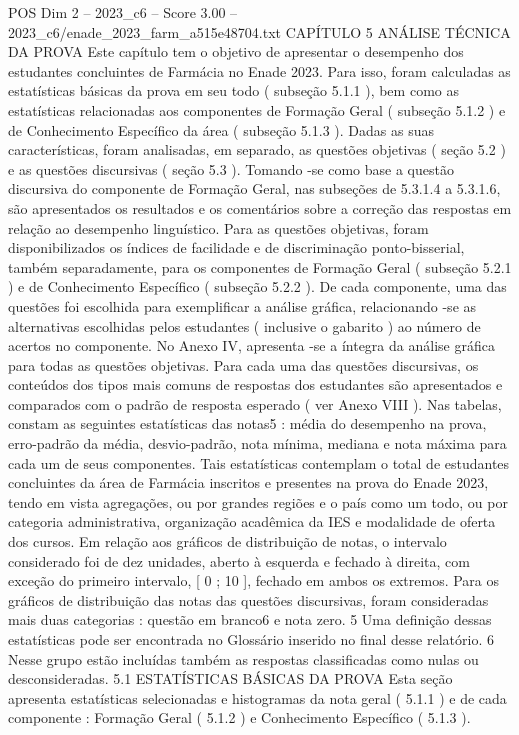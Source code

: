\begin{textsample}{POS Dim 2 – 2023\_c6 – Score 3.00 – 2023\_c6/enade\_2023\_farm\_a515e48704.txt}  \label{ex:f2_pos_164}
CAPÍTULO 5 ANÁLISE TÉCNICA DA PROVA Este capítulo tem o objetivo de apresentar o desempenho dos estudantes concluintes de Farmácia no Enade 2023.
Para isso, foram calculadas as estatísticas básicas da prova em seu todo ( subseção 5.1.1 ), bem como as estatísticas relacionadas aos componentes de Formação Geral ( subseção 5.1.2 ) e de Conhecimento Específico da área ( subseção 5.1.3 ).
Dadas as suas características, foram analisadas, em separado, as questões objetivas ( seção 5.2 ) e as questões discursivas ( seção 5.3 ).
Tomando -se como base a questão discursiva do componente de Formação Geral, nas subseções de 5.3.1.4 a 5.3.1.6, são apresentados os resultados e os comentários sobre a correção das respostas em relação ao desempenho linguístico.
Para as questões objetivas, foram disponibilizados os índices de facilidade e de discriminação ponto-bisserial, também separadamente, para os componentes de Formação Geral ( subseção 5.2.1 ) e de Conhecimento Específico ( subseção 5.2.2 ).
De cada componente, uma das questões foi escolhida para exemplificar a análise gráfica, relacionando -se as alternativas escolhidas pelos estudantes ( inclusive o gabarito ) ao número de acertos no componente.
No Anexo IV, apresenta -se a íntegra da análise gráfica para todas as questões objetivas.
Para cada uma das questões discursivas, os conteúdos dos tipos mais comuns de respostas dos estudantes são apresentados e comparados com o padrão de resposta esperado ( ver Anexo VIII ).
Nas tabelas, constam as seguintes estatísticas das notas5 : média do desempenho na prova, erro-padrão da média, desvio-padrão, nota mínima, mediana e nota máxima para cada um de seus componentes.
Tais estatísticas contemplam o total de estudantes concluintes da área de Farmácia inscritos e presentes na prova do Enade 2023, tendo em vista agregações, ou por grandes regiões e o país como um todo, ou por categoria administrativa, organização acadêmica da IES e modalidade de oferta dos cursos.
Em relação aos gráficos de distribuição de notas, o intervalo considerado foi de dez unidades, aberto à esquerda e fechado à direita, com exceção do primeiro intervalo, [ 0 ; 10 ], fechado em ambos os extremos.
Para os gráficos de distribuição das notas das questões discursivas, foram consideradas mais duas categorias : questão em branco6 e nota zero. 5 Uma definição dessas estatísticas pode ser encontrada no Glossário inserido no final desse relatório. 6 Nesse grupo estão incluídas também as respostas classificadas como nulas ou desconsideradas. 5.1 ESTATÍSTICAS BÁSICAS DA PROVA Esta seção apresenta estatísticas selecionadas e histogramas da nota geral ( 5.1.1 ) e de cada componente : Formação Geral ( 5.1.2 ) e Conhecimento Específico ( 5.1.3 ).

\end{textsample}
